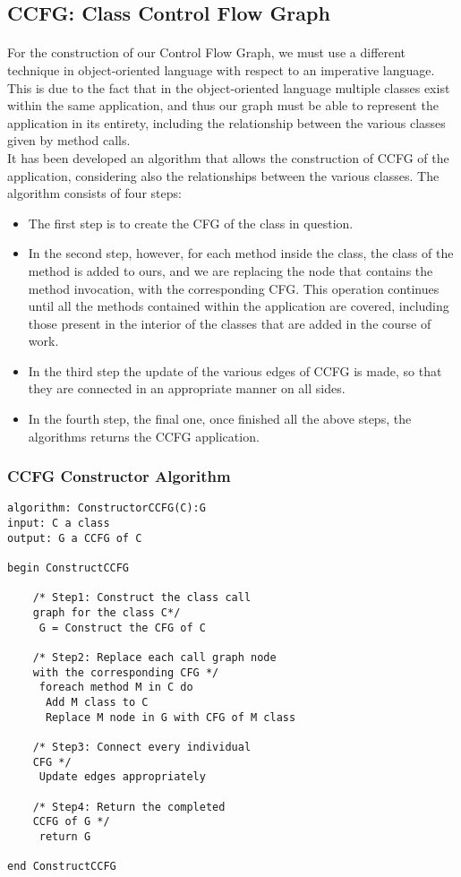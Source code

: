 \documentclass[letterpaper,twocolumn,10pt]{article}
\begin{document}
\subsection{CCFG: Class Control Flow Graph~\cite{CCFG}}
\paragraph{}
For the construction of our Control Flow Graph, we must use a different technique in object-oriented language with respect to an imperative language. This is due to the fact that in the object-oriented language  multiple classes exist within the same application, and thus our graph must be able to represent the application in its entirety, including the relationship between the various classes given by method calls.\\
It has been developed an algorithm that allows the construction of CCFG of the application, considering also the relationships between the various classes. The algorithm consists of four steps:
\begin{itemize}
\item The first step is to create the CFG of the class in question. 
\item In the second step, however, for each method inside the class, the class of the method is added to ours, and we are replacing the node that contains the method invocation, with the corresponding CFG. This operation continues until all the methods contained within the application are covered, including those present in the interior of the classes that are added in the course of work.  
\item In the third step the update of the various edges of CCFG is made, so that they are connected in an appropriate manner on all sides.
\item In the fourth step, the final one, once finished all the above steps, the algorithms returns the CCFG application.
\end{itemize}

\subsubsection{CCFG Constructor Algorithm}
\lstset{basicstyle=\small\ttfamily, tabsize=2}
\begin{lstlisting}
algorithm: ConstructorCCFG(C):G
input: C a class
output: G a CCFG of C

begin ConstructCCFG
	
	/* Step1: Construct the class call 
	graph for the class C*/ 
	 G = Construct the CFG of C
	  
	/* Step2: Replace each call graph node 
	with the corresponding CFG */
	 foreach method M in C do
	  Add M class to C	  
	  Replace M node in G with CFG of M class

	/* Step3: Connect every individual 
	CFG */
	 Update edges appropriately 

	/* Step4: Return the completed 
	CCFG of G */
	 return G

end ConstructCCFG
\end{lstlisting}
\end{document}
